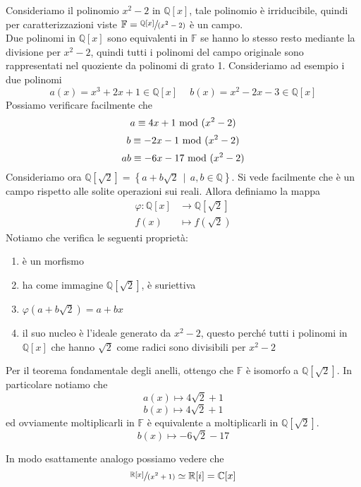 \begin{esempio}
	Consideriamo il polinomio $x^2-2$ in $\mathbb{Q}[x]$, tale polinomio è irriducibile, quindi per caratterizzazioni viste $\mathbb{F}=\sfrac{\mathbb{Q}[x]}{(x^2-2)}$ è un campo. \\ Due polinomi in $\mathbb{Q}[x]$ sono equivalenti in $\mathbb{F}$ se hanno lo stesso resto mediante la divisione per $x^2-2$, quindi tutti i polinomi del campo originale sono rappresentati nel quoziente da polinomi di grato 1. Consideriamo ad esempio i due polinomi 
	\begin{equation*}
	a(x)=x^3+2x+1 \in \mathbb{Q}[x] \quad\ b(x)=x^2-2x-3 \in\mathbb{Q}[x]
	\end{equation*}
	Possiamo verificare facilmente che 
	\begin{equation*}
	a\equiv4x+1\ \mathrm{mod}\ (x^2-2)
	\end{equation*}
	\begin{equation*}
	b\equiv-2x-1\ \mathrm{mod}\ (x^2-2)
	\end{equation*}
	\begin{equation*}
	ab\equiv-6x-17\ \mathrm{mod}\ (x^2-2)
	\end{equation*}
	Consideriamo ora $\mathbb{Q}[\sqrt{2}]=\left\{a+b\sqrt{2} \, \mid \, a,b\in\mathbb{Q}\right\}$. Si vede facilmente che è un campo rispetto alle solite operazioni sui reali. Allora definiamo la mappa
	\begin{align*}
	\varphi:\mathbb{Q}[x]&\longrightarrow\mathbb{Q}[\sqrt{2}]\\
	f(x)&\longmapsto f(\sqrt{2})
	\end{align*}
	Notiamo che verifica le seguenti proprietà:
	\begin{enumerate}
		\item è un morfismo
		\item ha come immagine $\mathbb{Q}[\sqrt{2}]$, è suriettiva
		\item $\varphi\left(a+b\sqrt{2}\right)=a+bx$
		\item il suo nucleo è l'ideale generato da $x^2-2$, questo perché tutti i polinomi in $\mathbb{Q}[x]$ che hanno $\sqrt{2}$ come radici sono divisibili per $x^2-2$
	\end{enumerate}
	Per il teorema fondamentale degli anelli, ottengo che $\mathbb{F}$ è isomorfo a $\mathbb{Q}[\sqrt{2}]$. In particolare notiamo che 
	\begin{equation*}
	a(x) \mapsto 4\sqrt{2}+1
	\end{equation*}
	\begin{equation*}
	b(x) \mapsto 4\sqrt{2}+1
	\end{equation*}
	ed ovviamente moltiplicarli in $\mathbb{F}$ è equivalente a moltiplicarli in $\mathbb{Q}[\sqrt{2}]$.
	\begin{equation*}
	b(x) \mapsto -6\sqrt{2}-17
	\end{equation*}
\end{esempio}
\begin{esempio}
	In modo esattamente analogo possiamo vedere che 
	\begin{equation*}
	\sfrac{\mathbb{R}[x]}{(x^2+1)}\simeq\mathbb{R}[i]=\mathbb{C}[x]
	\end{equation*}
\end{esempio}




